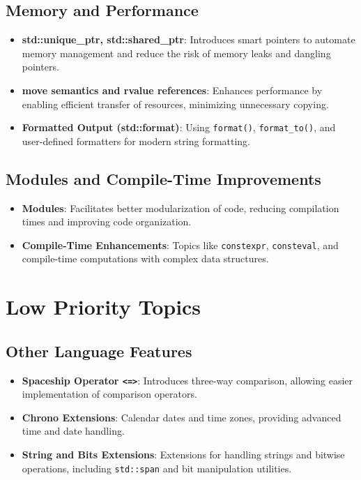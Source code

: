 \documentclass{article}
\begin{document}
\subsection*{Memory and Performance}
\begin{itemize}
    \item \textbf{std::unique\_ptr, std::shared\_ptr}:
    Introduces smart pointers to automate memory management and reduce the risk of memory leaks and dangling pointers.

    \item \textbf{move semantics and rvalue references}:
    Enhances performance by enabling efficient transfer of resources, minimizing unnecessary copying.
    
    \item \textbf{Formatted Output (std::format)}:
    Using \texttt{format()}, \texttt{format\_to()}, and user-defined formatters for modern string formatting.
\end{itemize}

\subsection*{Modules and Compile-Time Improvements}
\begin{itemize}
    \item \textbf{Modules}:
    Facilitates better modularization of code, reducing compilation times and improving code organization.

    \item \textbf{Compile-Time Enhancements}:
    Topics like \texttt{constexpr}, \texttt{consteval}, and compile-time computations with complex data structures.
\end{itemize}

\section*{Low Priority Topics}

\subsection*{Other Language Features}
\begin{itemize}
    \item \textbf{Spaceship Operator \texttt{<=>}}:
    Introduces three-way comparison, allowing easier implementation of comparison operators.

    \item \textbf{Chrono Extensions}:
    Calendar dates and time zones, providing advanced time and date handling.

    \item \textbf{String and Bits Extensions}:
    Extensions for handling strings and bitwise operations, including \texttt{std::span} and bit manipulation utilities.
\end{itemize}
\end{document}
